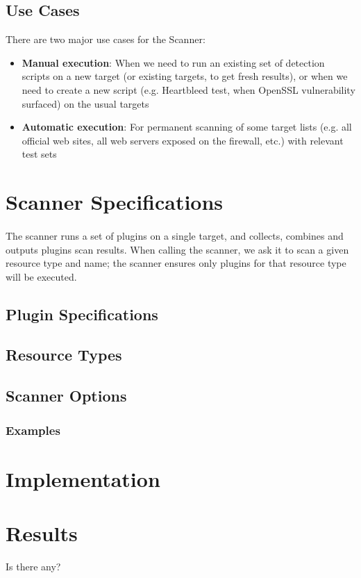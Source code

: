 \subsection{Use Cases}
There are two major use cases for the Scanner:
\begin{itemize}
\item \textbf{Manual execution}: When we need to run an existing set of detection scripts on a new target (or existing targets, to get fresh results), or when we need to create a new script (e.g. Heartbleed test, when OpenSSL vulnerability surfaced) on the usual targets
\item \textbf{Automatic execution}: For permanent scanning of some target lists (e.g. all official web sites, all web servers exposed on the firewall, etc.) with relevant test sets
\end{itemize}

\section{Scanner Specifications}
\paragraph{}
The scanner runs a set of plugins on a single target, and collects, combines and outputs plugins scan results. 
When calling the scanner, we ask it to scan a given resource type and name; the scanner ensures only plugins for that resource type will be executed. 

\subsection{Plugin Specifications}
\subsection{Resource Types}
\subsection{Scanner Options}
\subsubsection{Examples}

\section{Implementation}
\section{Results}
Is there any?



